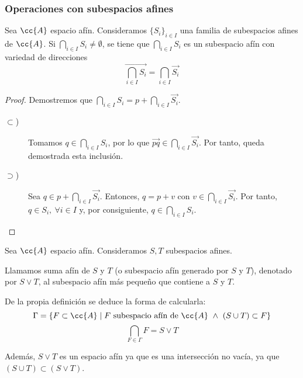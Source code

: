 \subsubsection{Operaciones con subespacios afines}
\begin{prop}[Intersección]
    Sea $\cc{A}$ espacio afín. Consideramos $\{S_i\}_{i\in I}$ una familia de subespacios afines de $\cc{A}$. Si $\bigcap\limits_{i\in I}S_i\neq \emptyset$, se tiene que $\bigcap\limits_{i\in I}S_i$ es un subespacio afín con variedad de direcciones
    \begin{equation*}
        \vec{\bigcap\limits_{i\in I}S_i} = \bigcap\limits_{i\in I}\vec{S_i}
    \end{equation*}
\end{prop}
\begin{proof}
    Demostremos que $\bigcap\limits_{i\in I}S_i=p+\bigcap\limits_{i\in I}\vec{S_i}$.

    \begin{description}
        \item[$\subset$)]
        Tomamos $q\in \bigcap\limits_{i\in I}S_i$, por lo que $\vec{pq}\in \bigcap\limits_{i\in I}\vec{S_i}$. Por tanto, queda demostrada esta inclusión.
        
        \item[$\supset$)] Sea $q\in p+\bigcap\limits_{i\in I}\vec{S_i}$. Entonces, $q=p+v$ con $v\in \bigcap\limits_{i\in I}\vec{S_i}$. Por tanto, $q\in S_i,~\forall i\in I$ y, por consiguiente, $q\in \bigcap\limits_{i\in I}S_i$.
    \end{description}
\end{proof}



\begin{definicion}
    Sea $\cc{A}$ espacio afín. Consideramos $S,T$ subespacios afines.
    
    Llamamos suma afín de $S$ y $T$ (o subespacio afín generado por $S$ y $T$), denotado por $S\vee T$, al subespacio afín más pequeño que contiene a $S$ y $T$.
\end{definicion}

De la propia definición se deduce la forma de calcularla:
$$\Gamma=\{F\subset \cc{A}\mid F \text{ subespacio afín de } \cc{A} ~\land~ (S\cup T)\subset F\}$$
$$\bigcap_{F\in \Gamma} F = S\vee T$$

Además, $S\vee T$ es un espacio afín ya que es una intersección no vacía, ya que $(S\cup T)\subset (S\vee T)$.

